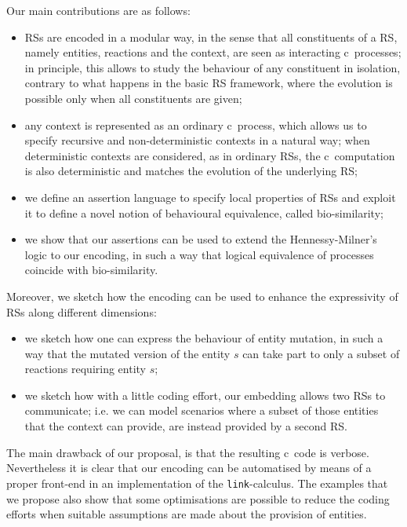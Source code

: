 Our main contributions are as follows:
\begin{itemize}
\item 
RSs are encoded in a modular way, in the sense that all constituents of a RS, namely entities, reactions and the context, are seen as interacting  c\CNA \ processes; in principle, this allows to study the behaviour of any constituent in isolation, contrary to what happens in the basic RS framework, where the evolution is possible only when all constituents are given;

\item any context is represented as an ordinary c\CNA \ process, which allows us to specify recursive and non-deterministic contexts in a natural way; 
when deterministic contexts are considered, as in ordinary RSs, the c\CNA \
computation is also deterministic and matches the evolution of the underlying RS;

\item we define an assertion language to specify local properties of 
RSs and exploit it to define a novel notion of behavioural equivalence,
called bio-similarity;

\item we show that our assertions can be used to extend the Hennessy-Milner's logic to our 
encoding, in such a way that logical equivalence of processes coincide with bio-similarity.
\end{itemize}

Moreover, we sketch how the encoding can be used to enhance the expressivity of RSs along different dimensions:
\begin{itemize}
\item we sketch how one can express the behaviour of entity mutation,
in such a way that the mutated version of the entity
$s$ can  take part to only a subset of reactions requiring entity $s$;
\item we sketch how with a little coding effort, our 
embedding
allows two RSs to
communicate; i.e. we can model scenarios where a subset of those entities that the context  can
provide, are instead provided by a second RS.
\end{itemize}

The main drawback of our proposal, is that the resulting c\CNA \ 
code
is
verbose. Nevertheless it is clear that our
encoding
can be automatised by means of a proper front-end in
an implementation of the {\tt link}-calculus. 
The examples that we propose also show that some optimisations are possible
to reduce the coding efforts when suitable assumptions are made about the provision of entities.

